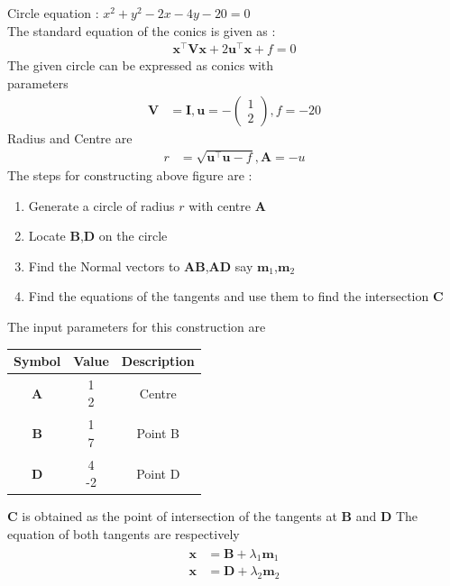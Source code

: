 \documentclass[10pt, a4paper]{article}
\newcommand{\myvec}[1]{\ensuremath{\begin{pmatrix}#1\end{pmatrix}}}
\let\vec\mathbf
\begin{document}
Circle equation : $x^2+y^2-2x-4y-20=0$\\
The standard equation of the conics is given as :
\begin{align}
\vec{x}^{\top}\vec{V}\vec{x}+2\vec{u}^{\top}\vec{x}+f=0
\end{align}
The given circle  can be expressed as conics with \\parameters
\begin{align}
	\vec{V} &= \vec{I}, \vec{u} = -\myvec{1 \\2}, f = -20
	\end{align}
	Radius and Centre are
	\begin{align}
	r &=\sqrt{{\vec{u}^{\top}\vec{u}}-f },\vec{A}=-u
    \end{align}
    The steps for constructing above figure are :
\begin{enumerate}
 \item Generate a circle of radius $r$ with centre $\vec{A}$ 
 \item Locate $\vec{B}$,$\vec{D}$ on the circle
 \item Find the Normal vectors to $\vec{A}$$\vec{B}$,$\vec{A}$$\vec{D}$ say $\vec{m}_1$,$\vec{m}_2$
\item Find the equations of the tangents and use them to find the intersection $\vec{C}$
\end{enumerate}
    The input parameters for this construction are
\begin{center}
\begin{tabular}{|c|c|c|}
	\hline
	\textbf{Symbol}&\textbf{Value}&\textbf{Description}\\
	\hline
	$\vec{A}$ &\myvec{1\\2}& Centre\\
	\hline
    $\vec{B}$ &\myvec{1\\7}&Point B\\
	\hline
 $\vec{D}$&\myvec{4\\-2}&Point D\\
	\hline
\end{tabular}
\end{center}
$\vec{C}$ is obtained as the point of intersection of the tangents at $\vec{B}$ and $\vec{D}$ 
The equation of both tangents are respectively 
\begin{align}
	\begin{split}
	\vec{x} &= \vec{B} + \lambda_1 \vec{m}_1
\\
		\vec{x} &= \vec{D} + \lambda_2 \vec{m}_2
		\label{eq:quad-circ-lam-B}
	\end{split}
\end{align}
\end{document}
